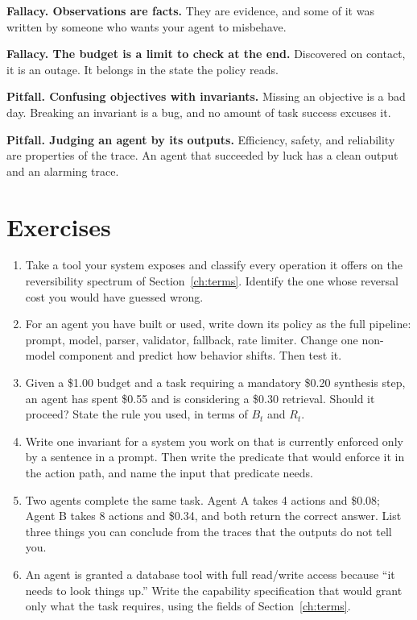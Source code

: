 \textbf{Fallacy. Observations are facts.} They are evidence, and some of it was
written by someone who wants your agent to misbehave.

\textbf{Fallacy. The budget is a limit to check at the end.} Discovered on
contact, it is an outage. It belongs in the state the policy reads.

\textbf{Pitfall. Confusing objectives with invariants.} Missing an objective is a
bad day. Breaking an invariant is a bug, and no amount of task success excuses it.

\textbf{Pitfall. Judging an agent by its outputs.} Efficiency, safety, and
reliability are properties of the trace. An agent that succeeded by luck has a
clean output and an alarming trace.

\section*{Exercises}

\begin{enumerate}
\item Take a tool your system exposes and classify every operation it offers on
the reversibility spectrum of Section~\ref{ch:terms}. Identify the one whose
reversal cost you would have guessed wrong.

\item For an agent you have built or used, write down its policy as the full
pipeline: prompt, model, parser, validator, fallback, rate limiter. Change one
non-model component and predict how behavior shifts. Then test it.

\item Given a \$1.00 budget and a task requiring a mandatory \$0.20 synthesis
step, an agent has spent \$0.55 and is considering a \$0.30 retrieval. Should it
proceed? State the rule you used, in terms of $B_t$ and $R_t$.

\item Write one invariant for a system you work on that is currently enforced
only by a sentence in a prompt. Then write the predicate that would enforce it in
the action path, and name the input that predicate needs.

\item Two agents complete the same task. Agent A takes 4 actions and \$0.08;
Agent B takes 8 actions and \$0.34, and both return the correct answer. List
three things you can conclude from the traces that the outputs do not tell you.

\item An agent is granted a database tool with full read/write access because
``it needs to look things up.'' Write the capability specification that would
grant only what the task requires, using the fields of Section~\ref{ch:terms}.
\end{enumerate}

